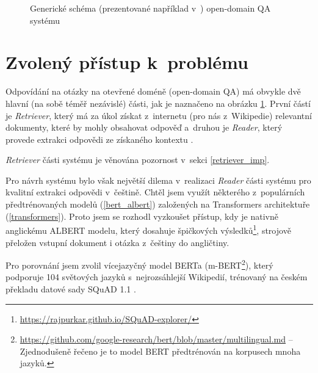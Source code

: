 \begin{figure}[hbt]
	\centering
	\caption{Generické schéma (prezentované například v~\cite{drQA}) open-domain QA systému}
	\label{qa_scheme}
\end{figure}

\section{Zvolený přístup k~problému}
Odpovídání na otázky na otevřené doméně (open-domain QA) má obvykle dvě hlavní (na sobě téměř nezávislé) části, jak je naznačeno na obrázku \ref{qa_scheme}. První částí je \emph{Retriever}, který má za úkol získat z~internetu (pro nás z~Wikipedie) relevantní dokumenty, které by mohly obsahovat odpověď a~druhou je \emph{Reader}, který provede extrakci odpovědi ze získaného kontextu \cite{drQA}.\par
\noindent\emph{Retriever} části systému je věnována pozornost v~sekci \ref{retriever_imp}.\par
Pro návrh systému bylo však největší dilema v~realizaci \emph{Reader} části systému pro kvalitní extrakci odpovědi v~češtině. Chtěl jsem využít některého z~populárních předtrénovaných modelů (\ref{bert_albert}) založených na Transformers \cite{Transformers} architektuře (\ref{transformers}). Proto jsem se rozhodl vyzkoušet přístup, kdy je nativně anglickému ALBERT modelu, který dosahuje špičkových výsledků\footnote{\url{https://rajpurkar.github.io/SQuAD-explorer/}}, strojově přeložen vstupní dokument i otázka z~češtiny do angličtiny.\par
Pro porovnání jsem zvolil vícejazyčný model BERTa (m-BERT\footnote{\url{https://github.com/google-research/bert/blob/master/multilingual.md} -- Zjednodušeně řečeno je to model BERT předtrénován na korpusech mnoha jazyků.}), který podporuje 104 světových jazyků s~nejrozsáhlejší Wikipedií, trénovaný na českém překladu datové sady SQuAD 1.1 \cite{czech_squad} \cite{squad}.\par

